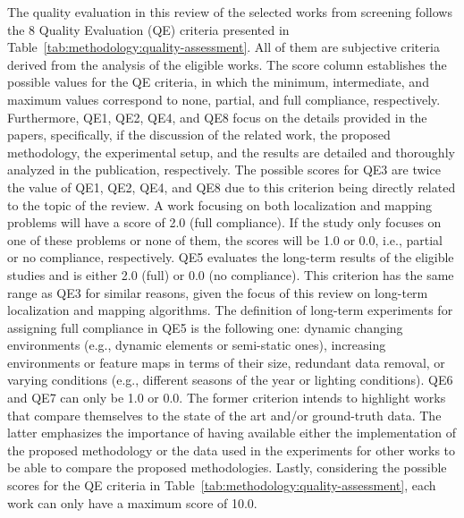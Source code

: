 The quality evaluation in this review of the selected works from screening follows the 8 Quality Evaluation (QE) criteria presented in Table~\ref{tab:methodology:quality-assessment}. All of them are subjective criteria derived from the analysis of the eligible works. The score column establishes the possible values for the QE criteria, in which the minimum, intermediate, and maximum values correspond to none, partial, and full compliance, respectively.
Furthermore, QE1, QE2, QE4, and QE8 focus on the details provided in the papers, specifically, if the discussion of the related work, the proposed methodology, the experimental setup, and the results are detailed and thoroughly analyzed in the publication, respectively.
The possible scores for QE3 are twice the value of QE1, QE2, QE4, and QE8 due to this criterion being directly related to the topic of the review. A work focusing on both localization and mapping problems will have a score of 2.0 (full compliance). If the study only focuses on one of these problems or none of them, the scores will be 1.0 or 0.0, i.e., partial or no compliance, respectively.
QE5 evaluates the long-term results of the eligible studies and is either 2.0 (full) or 0.0 (no compliance). This criterion has the same range as QE3 for similar reasons, given the focus of this review on long-term localization and mapping algorithms.
The definition of long-term experiments for assigning full compliance in QE5 is the following one: dynamic changing environments (e.g., dynamic elements or semi-static ones), increasing environments or feature maps in terms of their size, redundant data removal, or varying conditions (e.g., different seasons of the year or lighting conditions).
QE6 and QE7 can only be 1.0 or 0.0. The former criterion intends to highlight works that compare themselves to the state of the art and/or ground-truth data. The latter emphasizes the importance of having available either the implementation of the proposed methodology or the data used in the experiments for other works to be able to compare the proposed methodologies.
Lastly, considering the possible scores for the QE criteria in Table~\ref{tab:methodology:quality-assessment}, each work can only have a  maximum score of 10.0.

